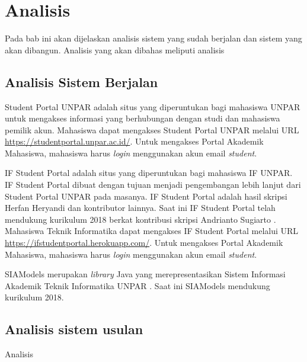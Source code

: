 \chapter{Analisis}
\label{chap:analisis}

Pada bab ini akan dijelaskan analisis sistem yang sudah berjalan dan sistem yang akan dibangun. Analisis yang akan dibahas meliputi analisis 

\section{Analisis Sistem Berjalan}
Student Portal UNPAR adalah situs yang diperuntukan bagi mahasiswa UNPAR untuk mengakses informasi yang berhubungan dengan studi dan mahasiswa pemilik akun\cite{BTI:2012}. Mahasiswa dapat mengakses Student Portal UNPAR melalui URL \url{https://studentportal.unpar.ac.id/}. Untuk mengakses Portal Akademik Mahasiswa, mahasiswa harus \textit{login} menggunakan akun email \textit{student}. 

IF Student Portal adalah situs yang diperuntukan bagi mahasiswa IF UNPAR\cite{ifstudentportalunpar}. IF Student Portal dibuat dengan tujuan menjadi pengembangan lebih lanjut dari Student Portal UNPAR pada masanya. IF Student Portal adalah hasil skripsi Herfan Heryandi \cite{herfan:15:portal} dan kontributor lainnya. Saat ini IF Student Portal telah mendukung kurikulum 2018 berkat kontribusi skripsi Andrianto Sugiarto \cite{andrianto:18:portalsiam}. Mahasiswa Teknik Informatika dapat mengakses IF Student Portal melalui URL \url{https://ifstudentportal.herokuapp.com/}. Untuk mengakses Portal Akademik Mahasiswa, mahasiswa harus \textit{login} menggunakan akun email \textit{student}. 

SIAModels merupakan \textit{library} Java yang merepresentasikan Sistem Informasi Akademik Teknik Informatika UNPAR \cite{siamodels}. Saat ini SIAModels mendukung kurikulum 2018. 


\section{Analisis sistem usulan}
Analisis
